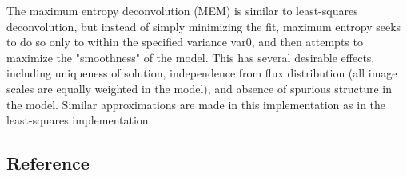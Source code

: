 The maximum entropy deconvolution (MEM) \cite{cornwell_evans1985,sault1990} is
similar to least-squares deconvolution, but instead of simply minimizing the
fit, maximum entropy seeks to do so only to within the specified variance
var0, and then attempts to maximize the "smoothness" of the model.  This has
several desirable effects, including uniqueness of solution, independence from
flux distribution (all image scales are equally weighted in the model), and
absence of spurious structure in the model.  Similar approximations are made
in this implementation as in the least-squares implementation.

\subsection{Reference}

